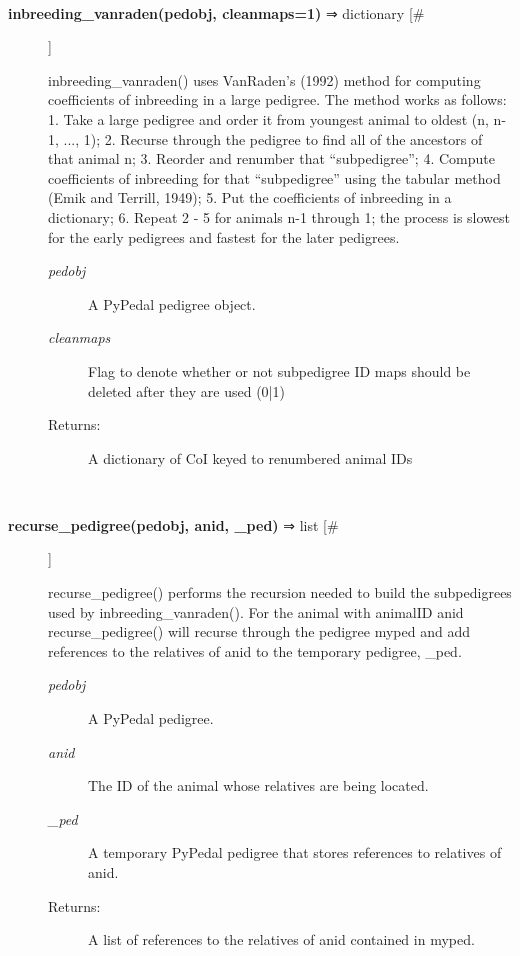 \begin{description}
\begin{description}
\end{description}
\\ 

\item[\textbf{inbreeding\_vanraden(pedobj, cleanmaps=1)}
 ⇒ dictionary [\#]]

 inbreeding\_vanraden() uses VanRaden's (1992) method for computing coefficients of inbreeding in a large pedigree. The method works as follows: 1. Take a large pedigree and order it from youngest animal to oldest (n, n-1, ..., 1); 2. Recurse through the pedigree to find all of the ancestors of that animal n; 3. Reorder and renumber that ``subpedigree''; 4. Compute coefficients of inbreeding for that ``subpedigree'' using the tabular method (Emik and Terrill, 1949); 5. Put the coefficients of inbreeding in a dictionary; 6. Repeat 2 - 5 for animals n-1 through 1; the process is slowest for the early pedigrees and fastest for the later pedigrees.
\begin{description}
\item[\emph{pedobj}
] A PyPedal pedigree object.
\item[\emph{cleanmaps}
] Flag to denote whether or not subpedigree ID maps should be deleted after they are used (0|1)
\item[Returns:] A dictionary of CoI keyed to renumbered animal IDs

\end{description}
\\ 

\item[\textbf{recurse\_pedigree(pedobj, anid, \_ped)}
 ⇒ list [\#]]

 recurse\_pedigree() performs the recursion needed to build the subpedigrees used by inbreeding\_vanraden(). For the animal with animalID anid recurse\_pedigree() will recurse through the pedigree myped and add references to the relatives of anid to the temporary pedigree, \_ped.
\begin{description}
\item[\emph{pedobj}
] A PyPedal pedigree.
\item[\emph{anid}
] The ID of the animal whose relatives are being located.
\item[\emph{\_ped}
] A temporary PyPedal pedigree that stores references to relatives of anid.
\item[Returns:] A list of references to the relatives of anid contained in myped.

\end{description}
\\ 


\end{description}
